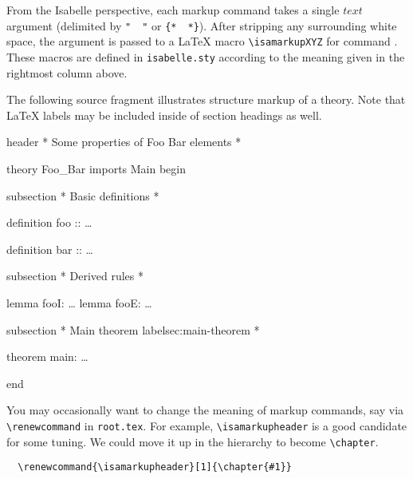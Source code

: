 \begin{isabellebody}
\begin{isamarkuptext}
  \medskip

  From the Isabelle perspective, each markup command takes a single
  $text$ argument (delimited by \verb,",~~\verb,", or
  \verb,{,\verb,*,~~\verb,*,\verb,},).  After stripping any
  surrounding white space, the argument is passed to a {\LaTeX} macro
  \verb,\isamarkupXYZ, for command .  These macros are
  defined in \verb,isabelle.sty, according to the meaning given in the
  rightmost column above.

  \medskip The following source fragment illustrates structure markup
  of a theory.  Note that {\LaTeX} labels may be included inside of
  section headings as well.

  \begin{ttbox}
  header {\ttlbrace}* Some properties of Foo Bar elements *{\ttrbrace}

  theory Foo_Bar
  imports Main
  begin

  subsection {\ttlbrace}* Basic definitions *{\ttrbrace}

  definition foo :: \dots

  definition bar :: \dots

  subsection {\ttlbrace}* Derived rules *{\ttrbrace}

  lemma fooI: \dots
  lemma fooE: \dots

  subsection {\ttlbrace}* Main theorem {\ttback}label{\ttlbrace}sec:main-theorem{\ttrbrace} *{\ttrbrace}

  theorem main: \dots

  end
  \end{ttbox}\vspace{-\medskipamount}

  You may occasionally want to change the meaning of markup commands,
  say via \verb,\renewcommand, in \texttt{root.tex}.  For example,
  \verb,\isamarkupheader, is a good candidate for some tuning.  We
  could move it up in the hierarchy to become \verb,\chapter,.

\begin{verbatim}
  \renewcommand{\isamarkupheader}[1]{\chapter{#1}}
\end{verbatim}


\end{isamarkuptext}
\end{isabellebody}
